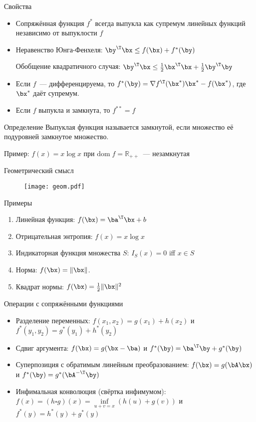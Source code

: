 \documentclass[12pt]{beamer}
\begin{document}
\begin{frame}{Свойства}
\begin{itemize}
\item Сопряжённая функция $f^*$ всегда выпукла как супремум линейных функций независимо от выпуклости $f$
\item Неравенство Юнга-Фенхеля: $\by^{\T}\bx \leq f(\bx) + f^*(\by)$

Обобщение квадратичного случая: $\by^{\T}\bx \leq \frac{1}{2}\bx^{\T}\bx + \frac{1}{2}\by^{\T}\by$
\item Если $f$~--- дифференцируема, то $f^*(\by) = \nabla f^{\T}(\bx^*)\bx^* - f(\bx^*)$, где $\bx^*$ даёт супремум.
\item Если $f$ выпукла и замкнута, то $f^{**} = f$
\end{itemize}

\begin{block}{Определение}
Выпуклая функция называется замкнутой, если множество её подуровней замкнутое множество.

Пример: $f(x) = x\log x$ при $\mathrm{dom} \; f = \mathbb{R}_{++}$~--- незамкнутая
\end{block}

\end{frame}

\begin{frame}{Геометрический смысл}
\begin{figure}
\texttt{[image: geom.pdf]}
\end{figure}
\end{frame}

\begin{frame}{Примеры}
\begin{enumerate}
\item Линейная функция: $f(\bx) = \ba^{\T}\bx + b$
\item Отрицательная энтропия: $f(x) = x\log x$
\item Индикаторная функция множества $S$: $I_S(x) = 0$ iff $x \in S$
\item Норма: $f(\bx) = \|\bx\|$.
\item Квадрат нормы: $f(\bx) = \frac{1}{2}\|\bx\|^2$
\end{enumerate}
\end{frame}

\begin{frame}{Операции с сопряжёнными функциями}

\begin{itemize}
\item Разделение переменных: $f(x_1, x_2) = g(x_1) + h(x_2)$ и $f^*(y_1, y_2) = g^*(y_1) + h^*(y_2)$
\item Сдвиг аргумента: $f(\bx) = g(\bx - \ba)$ и $f^*(\by) = \ba^{\T}\by + g^*(\by)$
\item Суперпозиция с обратимым линейным преобразованием: $f(\bx) = g(\bA\bx)$ и $f^*(\by) = g^*(\bA^{-\T}\by)$
\item Инфимальная конволюция (свёртка инфимумом):  $f(x) = (h \square g)(x) = \inf\limits_{u + v = x} (h(u) + g(v))$ и $f^*(y) = h^*(y) + g^*(y)$
\end{itemize}

\end{frame}
\end{document}
